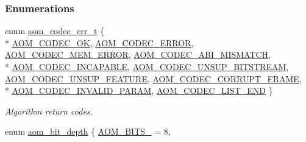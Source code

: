 \subsubsection*{Enumerations}
\begin{DoxyCompactItemize}
\item 
enum \hyperlink{group__codec_gaaae61e0f8663e6137f1e228757248e7c}{aom\+\_\+codec\+\_\+err\+\_\+t} \{ \\*
\hyperlink{group__codec_ggaaae61e0f8663e6137f1e228757248e7caf145dc2f86014a08ebad36ac2b140001}{A\+O\+M\+\_\+\+C\+O\+D\+E\+C\+\_\+\+OK}, 
\hyperlink{group__codec_ggaaae61e0f8663e6137f1e228757248e7ca20f818786bc939e6e58192f6a150d691}{A\+O\+M\+\_\+\+C\+O\+D\+E\+C\+\_\+\+E\+R\+R\+OR}, 
\hyperlink{group__codec_ggaaae61e0f8663e6137f1e228757248e7caa4328d9fc527a3fd3cf76eb54e3db1a2}{A\+O\+M\+\_\+\+C\+O\+D\+E\+C\+\_\+\+M\+E\+M\+\_\+\+E\+R\+R\+OR}, 
\hyperlink{group__codec_ggaaae61e0f8663e6137f1e228757248e7ca7cbf0a1ff28bf7c460f6d86d63b30842}{A\+O\+M\+\_\+\+C\+O\+D\+E\+C\+\_\+\+A\+B\+I\+\_\+\+M\+I\+S\+M\+A\+T\+CH}, 
\\*
\hyperlink{group__codec_ggaaae61e0f8663e6137f1e228757248e7cac4a4eea6394661cef74abf674c12cfa8}{A\+O\+M\+\_\+\+C\+O\+D\+E\+C\+\_\+\+I\+N\+C\+A\+P\+A\+B\+LE}, 
\hyperlink{group__codec_ggaaae61e0f8663e6137f1e228757248e7ca38b6a9786805f6c215cff72985cc6fdb}{A\+O\+M\+\_\+\+C\+O\+D\+E\+C\+\_\+\+U\+N\+S\+U\+P\+\_\+\+B\+I\+T\+S\+T\+R\+E\+AM}, 
\hyperlink{group__codec_ggaaae61e0f8663e6137f1e228757248e7ca94436b9b9d07909fe2e85b39ef0b5615}{A\+O\+M\+\_\+\+C\+O\+D\+E\+C\+\_\+\+U\+N\+S\+U\+P\+\_\+\+F\+E\+A\+T\+U\+RE}, 
\hyperlink{group__codec_ggaaae61e0f8663e6137f1e228757248e7ca8b4b7f7b3ea2a3a0e07b82c9170775a2}{A\+O\+M\+\_\+\+C\+O\+D\+E\+C\+\_\+\+C\+O\+R\+R\+U\+P\+T\+\_\+\+F\+R\+A\+ME}, 
\\*
\hyperlink{group__codec_ggaaae61e0f8663e6137f1e228757248e7ca0c6ff8587f8bcc0429aecfa9fe2762df}{A\+O\+M\+\_\+\+C\+O\+D\+E\+C\+\_\+\+I\+N\+V\+A\+L\+I\+D\+\_\+\+P\+A\+R\+AM}, 
\hyperlink{group__codec_ggaaae61e0f8663e6137f1e228757248e7ca413c6090fa855359106e32fbd2b5f668}{A\+O\+M\+\_\+\+C\+O\+D\+E\+C\+\_\+\+L\+I\+S\+T\+\_\+\+E\+ND}
 \}\begin{DoxyCompactList}\small\item\em Algorithm return codes. \end{DoxyCompactList}
\item 
enum \hyperlink{group__codec_ga6ed0e98eba4651c1ad845e39498e4153}{aom\+\_\+bit\+\_\+depth} \{ \hyperlink{group__codec_gga6ed0e98eba4651c1ad845e39498e4153a4c7f55539160206a3fbb2a6cfc9ef89c}{A\+O\+M\+\_\+\+B\+I\+T\+S\+\_} = 8, 

\end{DoxyCompactItemize}
